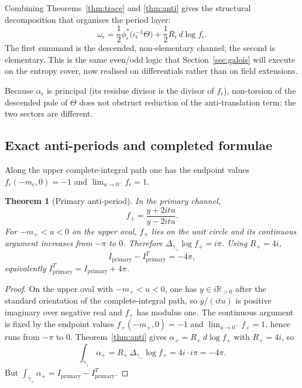 \documentclass[11pt,a4paper]{article}
\newtheorem{theorem}{Theorem}[section]
\theoremstyle{definition}
\theoremstyle{remark}
\newcommand{\RR}{\mathbb{R}}
\begin{document}
Combining Theorems~\ref{thm:trace} and \ref{thm:anti} gives the structural
decomposition that organises the period layer:
\begin{equation}
\boxed{
\omega_\epsilon
=
\frac12\phi_\epsilon^*\bigl(\iota_\epsilon^{-1}\Theta\bigr)
+
\frac12 R_\epsilon\,d\log f_\epsilon.
}
\label{eq:master-split}
\end{equation}
The first summand is the descended, non-elementary channel; the second is
elementary. This is the same even/odd logic that Section~\ref{sec:galois} will
execute on the entropy cover, now realised on differentials rather than on
field extensions.

Because \(\alpha_\epsilon\) is principal (its residue divisor is the divisor of
\(f_\epsilon\)), non-torsion of the descended pole of \(\Theta\) does not obstruct
reduction of the anti-translation term: the two sectors are different.

\subsection{Exact anti-periods and completed formulae}

Along the upper complete-integral path one has the endpoint values
\(f_\epsilon(-m_\epsilon,0)=-1\) and \(\lim_{u\to0^-}f_\epsilon=1\).

\begin{theorem}[Primary anti-period]
\label{thm:primary}
In the primary channel,
\[
f_+
=
\frac{y+2itu}{y-2itu}.
\]
For \(-m_+<u<0\) on the upper oval, \(f_+\) lies on the unit circle and its
continuous argument increases from \(-\pi\) to \(0\). Therefore
\(\Delta_{\gamma_+}\log f_+=i\pi\). Using \(R_+=4i\),
\begin{equation}
\boxed{I_{\mathrm{primary}}-I_{\mathrm{primary}}^T=-4\pi,}
\label{eq:Iprim}
\end{equation}
equivalently \(I_{\mathrm{primary}}^T=I_{\mathrm{primary}}+4\pi\).
\end{theorem}

\begin{proof}
On the upper oval with \(-m_+<u<0\), one has \(y\in i\RR_{>0}\) after the standard
orientation of the complete-integral path, so \(y/(itu)\) is positive imaginary
over negative real and \(f_+\) has modulus one. The continuous argument is
fixed by the endpoint values \(f_+(-m_+,0)=-1\) and
\(\lim_{u\to0^-}f_+=1\), hence runs from \(-\pi\) to \(0\). Theorem~\ref{thm:anti}
gives \(\alpha_+=R_+\,d\log f_+\) with \(R_+=4i\), so
\[
\int_{\gamma_+}\alpha_+
=
R_+\,\Delta_{\gamma_+}\log f_+
=
4i\cdot i\pi
=
-4\pi.
\]
But \(\int_{\gamma_+}\alpha_+=I_{\mathrm{primary}}-I_{\mathrm{primary}}^T\).
\end{proof}
\end{document}
